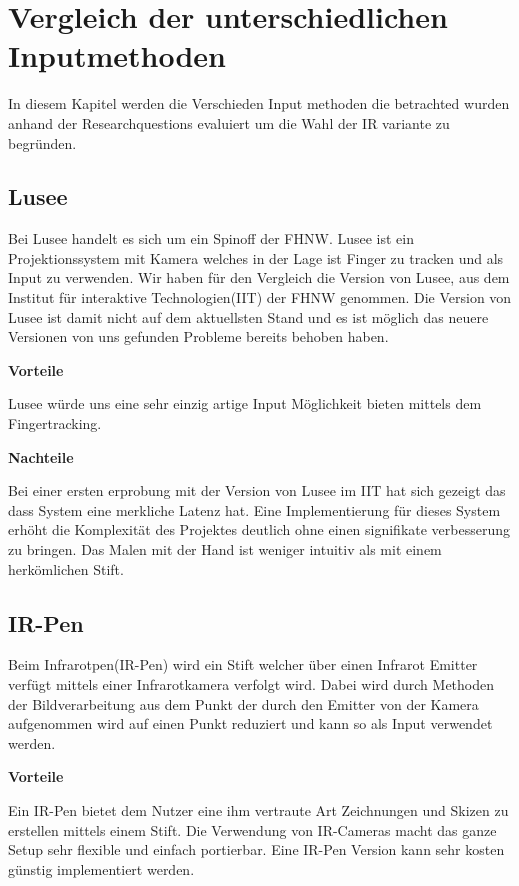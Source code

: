 
\section{Vergleich der unterschiedlichen Inputmethoden}

In diesem Kapitel werden die Verschieden Input methoden die betrachted wurden anhand der Researchquestions evaluiert um die Wahl der IR variante zu begründen.

\subsection{Lusee}

Bei Lusee handelt es sich um ein Spinoff der FHNW. Lusee ist ein Projektionssystem mit Kamera welches in der Lage ist Finger zu tracken und als Input zu verwenden. Wir haben für den Vergleich die Version von Lusee, aus dem Institut für interaktive Technologien(IIT) der FHNW genommen. Die Version von Lusee ist damit nicht auf dem aktuellsten Stand und es ist möglich das neuere Versionen von uns gefunden Probleme bereits behoben haben. 

\textbf{Vorteile}

Lusee würde uns eine sehr einzig artige Input Möglichkeit bieten mittels dem Fingertracking.

\textbf{Nachteile}

Bei einer ersten erprobung mit der Version von Lusee im IIT hat sich gezeigt das dass System eine merkliche Latenz hat. 
Eine Implementierung für dieses System erhöht die Komplexität des Projektes deutlich ohne einen signifikate verbesserung zu bringen.
Das Malen mit der Hand ist weniger intuitiv als mit einem herkömlichen Stift.

\subsection{IR-Pen}

Beim Infrarotpen(IR-Pen) wird ein Stift welcher über einen Infrarot Emitter verfügt mittels einer Infrarotkamera verfolgt wird. Dabei wird durch Methoden der Bildverarbeitung aus dem Punkt der durch den Emitter von der Kamera aufgenommen wird auf einen Punkt reduziert und kann so als Input verwendet werden.

\textbf{Vorteile}

Ein IR-Pen bietet dem Nutzer eine ihm vertraute Art Zeichnungen und Skizen zu erstellen mittels einem Stift. 
Die Verwendung von IR-Cameras macht das ganze Setup sehr flexible und einfach portierbar.
Eine IR-Pen Version kann sehr kosten günstig implementiert werden.

